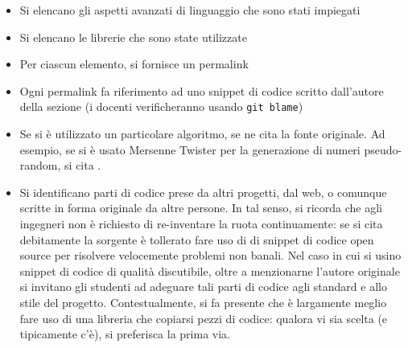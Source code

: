 \documentclass[a4paper,12pt]{report}
\begin{document}
\begin{itemize}
	\item Si elencano gli aspetti avanzati di linguaggio che sono stati impiegati
	\item Si elencano le librerie che sono state utilizzate
	\item Per ciascun elemento, si fornisce un permalink
	\item Ogni permalink fa riferimento ad uno snippet di codice scritto dall'autore della sezione (i docenti verificheranno usando \texttt{git blame})
	\item Se si è utilizzato un particolare algoritmo, se ne cita la fonte originale.
	      Ad esempio, se si è usato Mersenne Twister per la generazione di numeri pseudo-random, si cita \cite{mersenne}.
	\item Si identificano parti di codice prese da altri progetti, dal web, o comunque scritte in forma originale da altre persone.
	      In tal senso, si ricorda che agli ingegneri non è richiesto di re-inventare la ruota continuamente:
	      se si cita debitamente la sorgente è tollerato fare uso di di snippet di codice open source per risolvere velocemente problemi non banali.
	      Nel caso in cui si usino snippet di codice di qualità discutibile,
	      oltre a menzionarne l'autore originale si invitano gli studenti ad adeguare tali parti di codice agli standard e allo stile del progetto.
	      Contestualmente, si fa presente che è largamente meglio fare uso di una libreria che copiarsi pezzi di codice:
	      qualora vi sia scelta (e tipicamente c'è), si preferisca la prima via.
\end{itemize}
\end{document}
